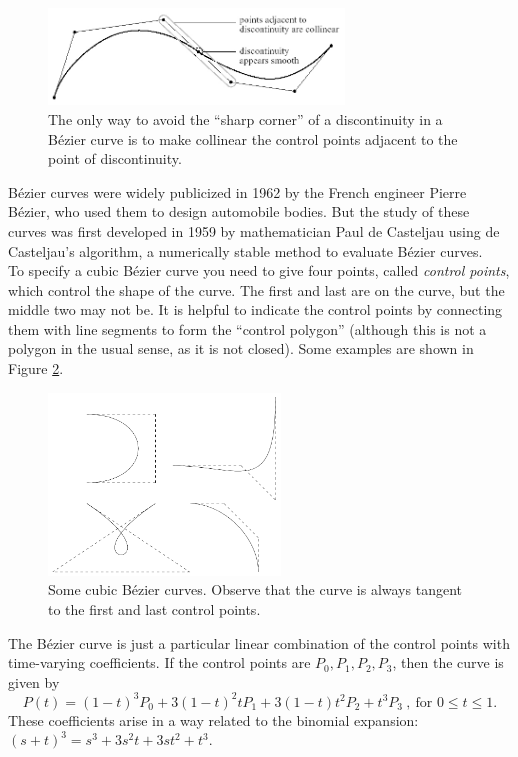 \documentclass[]{usiinfbachelorproject}
\begin{document}
\begin{figure}[ht]
	\centering
	\includegraphics[width=0.7\textwidth]{img/BezierContinuity.jpeg}
	\caption{The only way to avoid the ``sharp corner'' of a discontinuity in a B\'ezier curve is to make collinear the control points adjacent to the point of discontinuity.}
	\label{fig:beziercontinuity}
\end{figure}

\noindent B\'ezier curves were widely publicized in 1962 by the French engineer Pierre B\'ezier, who used them to design automobile bodies. But the study of these curves was first developed in 1959 by mathematician Paul de Casteljau using de Casteljau's algorithm, a numerically stable method to evaluate B\'ezier curves.\\
To specify a cubic B\'ezier curve you need to give four points, called \emph{control points}, which control the shape of the curve. The first and last are on the curve, but the middle two may not be. It is helpful to indicate the control points by connecting them with line segments to form the ``control polygon'' (although this is not a polygon in the usual sense, as it is not closed). Some examples are shown in Figure \ref{fig:bezierex}.

\begin{figure}[ht]
	\centering
	\includegraphics[width=0.55\textwidth]{img/bezier_examples.png}
	\caption{Some cubic B\'ezier curves. Observe that the curve is always tangent to the first and last control points.}
	\label{fig:bezierex}
\end{figure}

The B\'ezier curve is just a particular linear combination of the control points with time-varying coefficients. If the control points are $P_0, P_1, P_2, P_3$, then the curve is given by
$$P(t) = (1 - t)^3P_0 + 3(1 - t)^2tP_1 + 3(1 - t)t^2P_2 + t^3P_3~,~\text{for } 0 \le t \le 1.$$
These coefficients arise in a way related to the binomial expansion: $(s + t)^3 = s^3 + 3s^2t + 3st^2 + t^3.$
\end{document}
